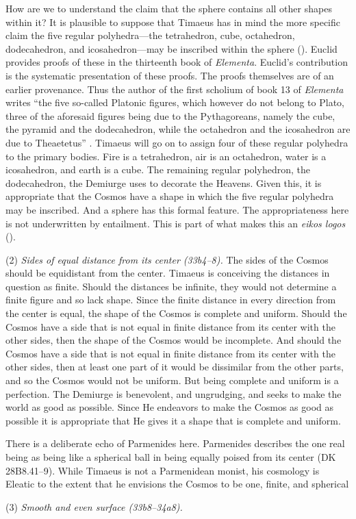 How are we to understand the claim that the sphere contains all other shapes within it? It is plausible to suppose that Timaeus has in mind the more specific claim the five regular polyhedra---the tetrahedron, cube, octahedron, dodecahedron, and icosahedron---may be inscribed within the sphere (\citealt[101--2]{Taylor:1928qb}). Euclid provides proofs of these in the thirteenth book of \emph{Elementa}. Euclid's contribution is the systematic presentation of these proofs. The proofs themselves are of an earlier provenance. Thus the author of the first scholium of book 13 of \emph{Elementa} writes ``the five so-called Platonic figures, which however do not belong to Plato, three of the aforesaid figures being due to the Pythagoreans, namely the cube, the pyramid and the dodecahedron, while the octahedron and the icosahedron are due to Theaetetus'' \citep[438]{Heath:1908th}. Timaeus will go on to assign four of these regular polyhedra to the primary bodies. Fire is a tetrahedron, air is an octahedron, water is a icosahedron, and earth is a cube. The remaining regular polyhedron, the dodecahedron, the Demiurge uses to decorate the Heavens. Given this, it is appropriate that the Cosmos have a shape in which the five regular polyhedra may be inscribed. And a sphere has this formal feature. The appropriateness here is not underwritten by entailment. This is part of what makes this an \emph{eikos logos} (\citealt[101]{Taylor:1928qb}).

(2) \emph{Sides of equal distance from its center (33b4--8).} The sides of the Cosmos should be equidistant from the center. Timaeus is conceiving the distances in question as finite. Should the distances be infinite, they would not determine a finite figure and so lack shape. Since the finite distance in every direction from the center is equal, the shape of the Cosmos is complete and uniform. Should the Cosmos have a side that is not equal in finite distance from its center with the other sides, then the shape of the Cosmos would be incomplete. And should the Cosmos have a side that is not equal in finite distance from its center with the other sides, then at least one part of it would be dissimilar from the other parts, and so the Cosmos would not be uniform. But being complete and uniform is a perfection. The Demiurge is benevolent, and ungrudging, and seeks to make the world as good as possible. Since He endeavors to make the Cosmos as good as possible it is appropriate that He gives it a shape that is complete and uniform.

There is a deliberate echo of Parmenides here. Parmenides describes the one real being as being like a spherical ball in being equally poised from its center (DK 28B8.41--9). While Timaeus is not a Parmenidean monist, his cosmology is Eleatic to the extent that he envisions the Cosmos to be one, finite, and spherical

(3) \emph{Smooth and even surface (33b8--34a8).}




